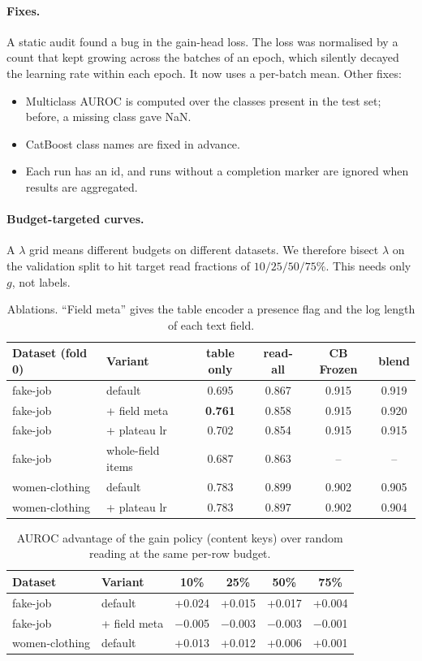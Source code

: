 \documentclass[11pt,a4paper]{article}
\begin{document}
\paragraph{Fixes.}
A static audit found a bug in the gain-head loss.
The loss was normalised by a count that kept growing across the batches of an epoch, which silently decayed the learning rate within each epoch.
It now uses a per-batch mean.
Other fixes:
\begin{itemize}[nosep]
  \item Multiclass AUROC is computed over the classes present in the test set; before, a missing class gave NaN.
  \item CatBoost class names are fixed in advance.
  \item Each run has an id, and runs without a completion marker are ignored when results are aggregated.
\end{itemize}

\paragraph{Budget-targeted curves.}
A $\lambda$ grid means different budgets on different datasets.
We therefore bisect $\lambda$ on the validation split to hit target read fractions of $10/25/50/75\%$.
This needs only $g$, not labels.

\begin{table}[H]
\centering
\small
\begin{tabular}{llcccc}
\toprule
Dataset (fold 0) & Variant & table only & read-all & CB Frozen & blend \\
\midrule
fake-job & default & 0.695 & 0.867 & 0.915 & 0.919 \\
fake-job & + field meta & \textbf{0.761} & 0.858 & 0.915 & 0.920 \\
fake-job & + plateau lr & 0.702 & 0.854 & 0.915 & 0.915 \\
fake-job & whole-field items & 0.687 & 0.863 & -- & -- \\
women-clothing & default & 0.783 & 0.899 & 0.902 & 0.905 \\
women-clothing & + plateau lr & 0.783 & 0.897 & 0.902 & 0.904 \\
\bottomrule
\end{tabular}
\caption{Ablations. ``Field meta'' gives the table encoder a presence flag and the log length of each text field.}
\end{table}

\begin{table}[H]
\centering
\small
\begin{tabular}{llcccc}
\toprule
Dataset & Variant & 10\% & 25\% & 50\% & 75\% \\
\midrule
fake-job & default & +0.024 & +0.015 & +0.017 & +0.004 \\
fake-job & + field meta & $-$0.005 & $-$0.003 & $-$0.003 & $-$0.001 \\
women-clothing & default & +0.013 & +0.012 & +0.006 & +0.001 \\
\bottomrule
\end{tabular}
\caption{AUROC advantage of the gain policy (content keys) over random reading at the same per-row budget.}
\end{table}
\end{document}
